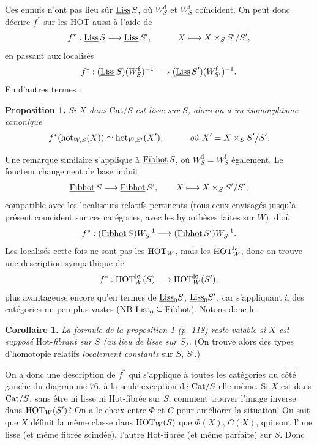 Ces ennuis n'ont pas lieu sûr $\underline{\mathrm{Liss}}\,S$, où $W_S^{\mathrm{d}}$ et $W_S^{\mathrm{f}}$ coïncident. On peut donc décrire $f^*$ sur les HOT aussi à l'aide de %
\[f^* : \underline{\mathrm{Liss}}\,S \longrightarrow \underline{\mathrm{Liss}}\,S', \qquad\quad X \longmapsto X \times_S S'/S',\]
en passant aux localisés
\[f^* : (\underline{\mathrm{Liss}}\,S)(W_S^{\mathrm{f}})^{-1} \longrightarrow (\underline{\mathrm{Liss}}\,S')(W_{S'}^{\mathrm{f}})^{-1}.\]
En d'autres termes :

\textbf{Proposition 1.} \textit{Si $X$ dans} Cat$/S$ \textit{est lisse sur $S$, alors on a un isomorphisme canonique}
\[f^*(\mathrm{hot}_{W,S}(X)) \simeq \mathrm{hot}_{W,S'}(X'), \qquad\quad \text{\textit{où} } X' = X \times_S S'/S'.\]


Une remarque similaire s'applique à $\underline{\mathrm{Fibhot}}\,S$, où $W_S^{\mathrm{d}} = W_S^{\mathrm{f}}$ également. Le foncteur changement de base induit
\[
\underline{\mathrm{Fibhot}}\,S \longrightarrow \underline{\mathrm{Fibhot}}\,S', \qquad X \longmapsto X \times_S S'/S',
\]
compatible avec les localiseurs relatifs pertinents (tous ceux envisagés jusqu'à présent coïncident sur ces catégories, avec les hypothèses faites sur $W$), d'où
\[
f^* : (\underline{\mathrm{Fibhot}}\,S)W_S^{-1} \longrightarrow (\underline{\mathrm{Fibhot}}\,S')W_{S'}^{-1}.
\]
Les localisés cette fois ne sont pas les $\mathrm{HOT}_W$, mais les $\mathrm{HOT}_W^{\mathrm{lc}}$, donc on trouve une description sympathique de
\[
f^* : \mathrm{HOT}_W^{\mathrm{lc}}(S) \longrightarrow \mathrm{HOT}_W^{\mathrm{lc}}(S'),
\]
plus avantageuse encore qu'en termes de $\underline{\mathrm{Liss}}_0S$, $\underline{\mathrm{Liss}}_0S'$, car s'appliquant à des catégories un peu plus vastes (NB $\underline{\mathrm{Liss}}_0 \subseteq \underline{\mathrm{Fibhot}}$). Notons donc le

\textbf{Corollaire 1.} \textit{La formule de la proposition 1 (p. 118) reste valable si $X$ est supposé} Hot-\textit{fibrant sur $S$ (au lieu de lisse sur $S$).} (On trouve alors des types d'homotopie relatifs \textit{localement constants} sur $S$, $S'$.)

On a donc une description de $f^*$ qui s'applique à toutes les catégories du côté gauche
du diagramme 76, à la seule exception de $\mathrm{Cat}/S$ elle-même. Si $X$ est dans $\mathrm{Cat}/S$, sans être ni lisse ni Hot-fibrée sur $S$, comment trouver l'image inverse dans $\mathrm{HOT}_W(S')$? On a le choix entre $\Phi$ et $C$ pour améliorer la situation! On sait que $X$ définit la même classe dans $\mathrm{HOT}_W(S)$ que $\Phi(X)$, $C(X)$, qui sont l'une lisse (et même fibrée scindée), l'autre Hot-fibrée (et même parfaite) sur $S$. Donc

